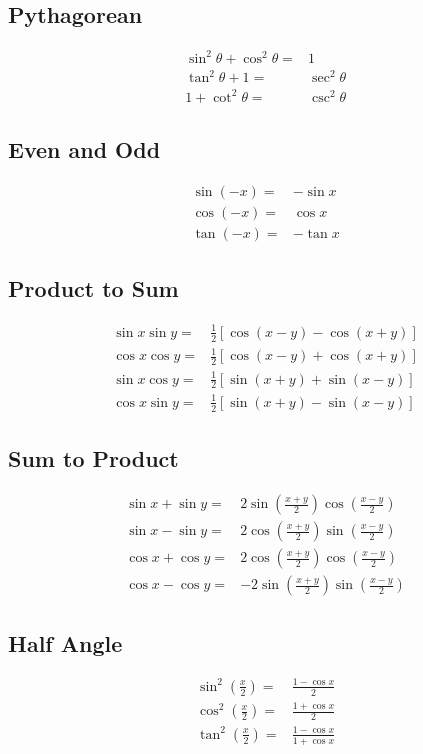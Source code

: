 \documentclass[10pt]{article}
\begin{document}
\begin{multicols}{2}
  \subsection*{Pythagorean}
  \begin{align*}
     & \sin^{2}\theta + \cos^{2}\theta = & 1              \\
     & \tan^{2}\theta + 1 =              & \sec^{2}\theta \\
     & 1 + \cot^{2}\theta =              & \csc^{2}\theta
  \end{align*}
  \subsection*{Even and Odd}
  \begin{align*}
     & \sin(-x) = & -\sin x \\
     & \cos(-x) = & \cos x  \\
     & \tan(-x) = & -\tan x
  \end{align*}
  \subsection*{Product to Sum}
  \begin{align*}
     & \sin x \sin y = & \frac{1}{2}[\cos(x-y) - \cos(x+y)] \\
     & \cos x \cos y = & \frac{1}{2}[\cos(x-y) + \cos(x+y)] \\
     & \sin x \cos y = & \frac{1}{2}[\sin(x+y) + \sin(x-y)] \\
     & \cos x \sin y = & \frac{1}{2}[\sin(x+y) - \sin(x-y)]
  \end{align*}
  \subsection*{Sum to Product}
  \begin{align*}
     & \sin x + \sin y = & 2\sin\left(\frac{x+y}{2}\right)\cos\left(\frac{x-y}{2}\right)  \\
     & \sin x - \sin y = & 2\cos\left(\frac{x+y}{2}\right)\sin\left(\frac{x-y}{2}\right)  \\
     & \cos x + \cos y = & 2\cos\left(\frac{x+y}{2}\right)\cos\left(\frac{x-y}{2}\right)  \\
     & \cos x - \cos y = & -2\sin\left(\frac{x+y}{2}\right)\sin\left(\frac{x-y}{2}\right)
  \end{align*}
  \subsection*{Half Angle}
  \begin{align*}
     & \sin^{2}\left(\frac{x}{2}\right) = & \frac{1 - \cos x}{2}          \\
     & \cos^{2}\left(\frac{x}{2}\right) = & \frac{1 + \cos x}{2}          \\
     & \tan^{2}\left(\frac{x}{2}\right) = & \frac{1 - \cos x}{1 + \cos x}
  \end{align*}

\end{multicols}
\end{document}
